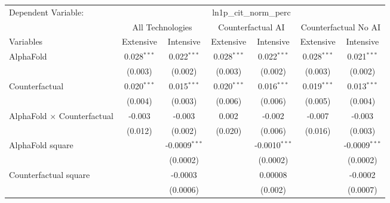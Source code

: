 \begingroup
\centering
\begin{tabular}{lcccccc}
   \tabularnewline \midrule \midrule
   Dependent Variable: & \multicolumn{6}{c}{ln1p\_cit\_norm\_perc}\\
 & \multicolumn{2}{c}{All Technologies} & \multicolumn{2}{c}{Counterfactual AI} & \multicolumn{2}{c}{Counterfactual No AI} \\
\cmidrule(lr){1-1}\cmidrule(lr){2-3} \cmidrule(lr){4-5} \cmidrule(lr){6-7}
Variables & \multicolumn{1}{c}{Extensive} & \multicolumn{1}{c}{Intensive} & \multicolumn{1}{c}{Extensive} & \multicolumn{1}{c}{Intensive} & \multicolumn{1}{c}{Extensive} & \multicolumn{1}{c}{Intensive} \\
\cmidrule(lr){1-1}\cmidrule(lr){2-2} \cmidrule(lr){3-3} \cmidrule(lr){4-4} \cmidrule(lr){5-5} \cmidrule(lr){6-6} \cmidrule(lr){7-7}
   AlphaFold                          & 0.028$^{***}$ & 0.022$^{***}$   & 0.028$^{***}$ & 0.022$^{***}$   & 0.028$^{***}$ & 0.021$^{***}$\\   
                                      & (0.003)       & (0.002)         & (0.003)       & (0.002)         & (0.003)       & (0.002)\\   
   Counterfactual                     & 0.020$^{***}$ & 0.015$^{***}$   & 0.020$^{***}$ & 0.016$^{***}$   & 0.019$^{***}$ & 0.013$^{***}$\\   
                                      & (0.004)       & (0.003)         & (0.006)       & (0.006)         & (0.005)       & (0.004)\\   
   AlphaFold $\times$ Counterfactual  & -0.003        & -0.003          & 0.002         & -0.002          & -0.007        & -0.003\\   
                                      & (0.012)       & (0.002)         & (0.020)       & (0.006)         & (0.016)       & (0.003)\\   
   AlphaFold square                   &               & -0.0009$^{***}$ &               & -0.0010$^{***}$ &               & -0.0009$^{***}$\\   
                                      &               & (0.0002)        &               & (0.0002)        &               & (0.0002)\\   
   Counterfactual square              &               & -0.0003         &               & 0.00008         &               & -0.0002\\   
                                      &               & (0.0006)        &               & (0.002)         &               & (0.0007)\\   

\end{tabular}
